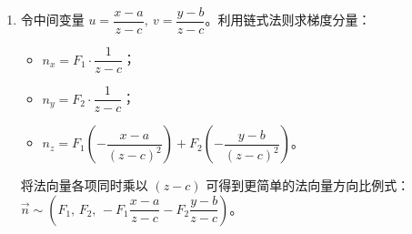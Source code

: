 \documentclass[lang=cn,11pt]{elegantbook}
\begin{document}
\begin{solution}
\begin{enumerate}
    \item[(4)] 令中间变量 $u = \dfrac{x-a}{z-c},\ v = \dfrac{y-b}{z-c}$。利用链式法则求梯度分量：
    \begin{itemize}
        \item $n_x = F_1 \cdot \dfrac{1}{z-c}$；
        \item $n_y = F_2 \cdot \dfrac{1}{z-c}$；
        \item $n_z = F_1 \left(-\dfrac{x-a}{(z-c)^2}\right) + F_2 \left(-\dfrac{y-b}{(z-c)^2}\right)$。
    \end{itemize}
    将法向量各项同时乘以 $(z-c)$ 可得到更简单的法向量方向比例式：
    $\vec{n} \sim \left( F_1,\, F_2,\, -F_1\dfrac{x-a}{z-c} - F_2\dfrac{y-b}{z-c} \right)$。
\end{enumerate}
\end{solution}
\end{document}
